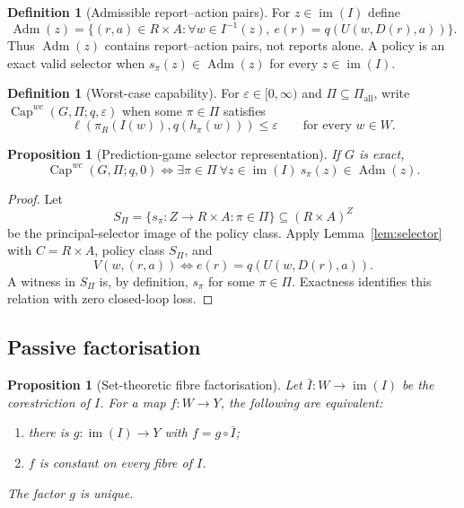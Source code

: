 \documentclass[11pt]{article}
\theoremstyle{plain}
\newtheorem{proposition}[theorem]{Proposition}
\theoremstyle{definition}
\newtheorem{definition}[theorem]{Definition}
\theoremstyle{remark}
\newcommand{\im}{\operatorname{im}}
\newcommand{\Capability}{\operatorname{Cap}}
\newcommand{\Adm}{\operatorname{Adm}}
\newcommand{\eps}{\varepsilon}
\begin{document}
\begin{definition}[Admissible report--action pairs]\label{def:admissible-pairs}
For $z\in\im(I)$ define
\[
\Adm(z)=\{(r,a)\in R\times A:
\forall w\in I^{-1}(z),\ e(r)=q(U(w,D(r),a))\}.
\]
Thus $\Adm(z)$ contains report--action pairs, not reports alone. A policy is an
exact valid selector when $s_\pi(z)\in\Adm(z)$ for every $z\in\im(I)$.
\end{definition}

\begin{definition}[Worst-case capability]\label{def:cap}
For $\eps\in[0,\infty)$ and $\Pi\subseteq\Pi_{\mathrm{all}}$, write
$\Capability^{wc}(G,\Pi;q,\eps)$ when some $\pi\in\Pi$ satisfies
\[
\ell(\pi_R(I(w)),q(h_\pi(w)))\le\eps
\qquad\text{for every }w\in W.
\]
\end{definition}

\begin{proposition}[Prediction-game selector representation]\label{prop:game-selector}
If $G$ is exact,
\[
\Capability^{wc}(G,\Pi;q,0)
\iff
\exists\pi\in\Pi\ \forall z\in\im(I)\ s_\pi(z)\in\Adm(z).
\]
\end{proposition}

\begin{proof}
Let
\[
S_\Pi=\{s_\pi:Z\to R\times A:\pi\in\Pi\}
\subseteq (R\times A)^Z
\]
be the principal-selector image of the policy class. Apply
Lemma~\ref{lem:selector} with $C=R\times A$, policy class $S_\Pi$, and
\[
V(w,(r,a))\iff e(r)=q(U(w,D(r),a)).
\]
A witness in $S_\Pi$ is, by definition, $s_\pi$ for some $\pi\in\Pi$.
Exactness identifies this relation with zero closed-loop loss.
\end{proof}

\subsection{Passive factorisation}

\begin{proposition}[Set-theoretic fibre factorisation]\label{prop:fibrefactor}
Let $\bar I:W\to\im(I)$ be the corestriction of $I$. For a map $f:W\to Y$,
the following are equivalent:
\begin{enumerate}[label=(\roman*)]
\item there is $g:\im(I)\to Y$ with $f=g\circ\bar I$;
\item $f$ is constant on every fibre of $I$.
\end{enumerate}
The factor $g$ is unique.
\end{proposition}
\end{document}
